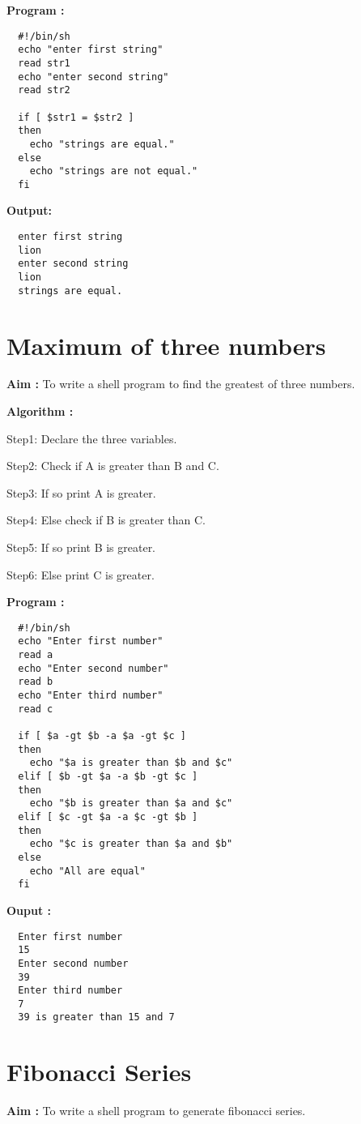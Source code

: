 \documentclass[journal,onecolumn]{IEEEtran}
\begin{document}
\textbf{Program : }
\begin{verbatim}
  #!/bin/sh
  echo "enter first string"
  read str1
  echo "enter second string"
  read str2

  if [ $str1 = $str2 ] 
  then
    echo "strings are equal."
  else
    echo "strings are not equal."
  fi
\end{verbatim}

\textbf{Output:}
\begin{verbatim}
  enter first string
  lion
  enter second string
  lion
  strings are equal.
\end{verbatim}


\section{Maximum of three numbers}
\textbf{Aim : } To write a shell program to find the greatest of three numbers.

\textbf{Algorithm : }
\begin{list}{}{}
  \item Step1: Declare the three variables.
  \item Step2: Check if A is greater than B and
        C.
  \item Step3: If so print A is greater.
  \item Step4: Else check if B is greater than
        C.
  \item Step5: If so print B is greater.
  \item Step6: Else print C is greater.
\end{list}

\textbf{Program : }
\begin{verbatim}
  #!/bin/sh
  echo "Enter first number"
  read a
  echo "Enter second number"
  read b
  echo "Enter third number"
  read c

  if [ $a -gt $b -a $a -gt $c ]
  then
    echo "$a is greater than $b and $c"
  elif [ $b -gt $a -a $b -gt $c ]
  then
    echo "$b is greater than $a and $c"
  elif [ $c -gt $a -a $c -gt $b ]
  then
    echo "$c is greater than $a and $b"
  else
    echo "All are equal"
  fi
\end{verbatim}

\textbf{Ouput :}
\begin{verbatim}
  Enter first number
  15
  Enter second number
  39
  Enter third number
  7 
  39 is greater than 15 and 7
\end{verbatim}

\section{Fibonacci Series}
\textbf{Aim : } To write a shell program to generate fibonacci series.
\end{document}
